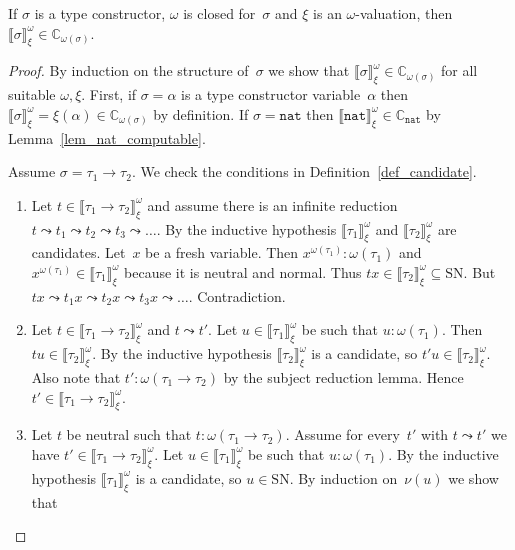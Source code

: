 \documentclass[runningheads,a4paper]{llncs}
\newcommand{\arrtype}{\rightarrow}
\newcommand{\nat}{\mathtt{nat}}
\newcommand{\SN}{\mathrm{SN}}
\newcommand{\Cb}{\mathbb{C}}
\newcommand{\val}[3]{\ensuremath{\llbracket#1\rrbracket_{#2}^{#3}}}
\begin{document}
\begin{lemma}\label{lem_val_computable}
  If $\sigma$ is a type constructor, $\omega$ is closed for~$\sigma$
  and $\xi$ is an $\omega$-valuation, then $\val{\sigma}{\xi}{\omega}
  \in \Cb_{\omega(\sigma)}$.
\end{lemma}

\begin{proof}
  By induction on the structure of~$\sigma$ we show that
  $\val{\sigma}{\xi}{\omega} \in \Cb_{\omega(\sigma)}$ for all
  suitable $\omega,\xi$. First, if $\sigma = \alpha$ is a type
  constructor variable~$\alpha$ then $\val{\sigma}{\xi}{\omega} =
  \xi(\alpha) \in \Cb_{\omega(\sigma)}$ by definition. If $\sigma =
  \nat$ then $\val{\nat}{\xi}{\omega} \in \Cb_{\nat}$ by
  Lemma~\ref{lem_nat_computable}.

  Assume $\sigma = \tau_1 \arrtype \tau_2$. We check the conditions in
  Definition~\ref{def_candidate}.
  \begin{enumerate}
  \item Let $t \in \val{\tau_1\arrtype\tau_2}{\xi}{\omega}$ and assume
    there is an infinite reduction $t \leadsto t_1 \leadsto t_2
    \leadsto t_3 \leadsto \ldots$. By the inductive hypothesis
    $\val{\tau_1}{\xi}{\omega}$ and $\val{\tau_2}{\xi}{\omega}$ are
    candidates. Let~$x$ be a fresh variable. Then $x^{\omega(\tau_1)}
    : \omega(\tau_1)$ and $x^{\omega(\tau_1)} \in
    \val{\tau_1}{\xi}{\omega}$ because it is neutral and normal. Thus
    $t x \in \val{\tau_2}{\xi}{\omega} \subseteq \SN$. But $t x
    \leadsto t_1 x \leadsto t_2 x \leadsto t_3 x \leadsto
    \ldots$. Contradiction.
  \item Let $t \in \val{\tau_1\arrtype\tau_2}{\xi}{\omega}$ and $t
    \leadsto t'$. Let $u \in \val{\tau_1}{\xi}{\omega}$ be such that
    $u : \omega(\tau_1)$. Then $t u \in \val{\tau_2}{\xi}{\omega}$. By
    the inductive hypothesis $\val{\tau_2}{\xi}{\omega}$ is a
    candidate, so $t' u \in \val{\tau_2}{\xi}{\omega}$. Also note that
    $t' : \omega(\tau_1 \arrtype \tau_2)$ by the subject reduction
    lemma. Hence $t' \in \val{\tau_1\arrtype\tau_2}{\xi}{\omega}$.
  \item Let $t$ be neutral such that $t : \omega(\tau_1 \arrtype
    \tau_2)$. Assume for every~$t'$ with $t \leadsto t'$ we have $t'
    \in \val{\tau_1\arrtype\tau_2}{\xi}{\omega}$. Let $u \in
    \val{\tau_1}{\xi}{\omega}$ be such that $u : \omega(\tau_1)$. By
    the inductive hypothesis $\val{\tau_1}{\xi}{\omega}$ is a
    candidate, so $u \in \SN$. By induction on~$\nu(u)$ we show that

\end{enumerate}
\end{proof}
\end{document}
